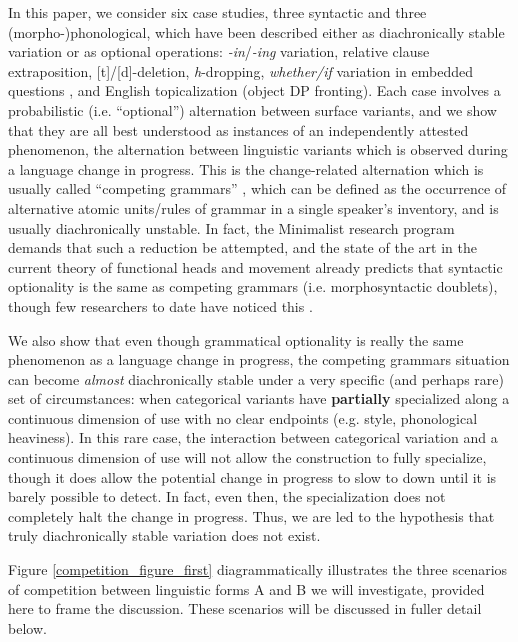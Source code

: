 In this paper, we consider six case studies, three syntactic and three (morpho-)phonological, which have been described either as diachronically stable variation or as optional operations: \textsl{-in}/\textsl{-ing} variation, relative clause extraposition, [t]/[d]-deletion, \textsl{h}-dropping, \textsl{whether/if} variation in embedded questions \citep{baileywallenbergwurff2012}, and English topicalization (object DP fronting).
Each case involves a probabilistic (i.e. ``optional'') alternation between surface variants, and we show that they are all best understood as instances of an independently attested phenomenon, the alternation between linguistic variants which is observed during a language change in progress.
This is the change-related alternation which is usually called ``competing grammars'' \citep[][]{kroch1989}, which can be defined as the occurrence of alternative atomic units/rules of grammar in a single speaker's inventory, and is usually diachronically unstable.
In fact, the Minimalist research program demands that such a reduction be attempted, and the state of the art in the current  theory of functional heads and movement already predicts that syntactic optionality is the same as competing grammars (i.e. morphosyntactic doublets), though few researchers to date have noticed this \citep[with the exception of][]{kroch1994}.

We also show that even though grammatical optionality is really the same phenomenon as a language change in progress, the competing grammars situation can become \textsl{almost} diachronically stable under a very specific (and perhaps rare) set of circumstances: when categorical variants have \textbf{partially} specialized along a continuous dimension of use with no clear endpoints (e.g. style, phonological heaviness). In this rare case, the interaction between categorical variation and a continuous dimension of use will not allow the construction to fully specialize, though it does allow the potential change in progress to slow to down until it is barely possible to detect. In fact, even then, the specialization does not completely halt the change in progress.
Thus, we are led to the hypothesis that truly diachronically stable variation does not exist.

Figure \ref{competition_figure_first} diagrammatically illustrates the three scenarios of competition between linguistic forms A and B we will investigate, provided here to frame the discussion. These scenarios will be discussed in fuller detail below.


